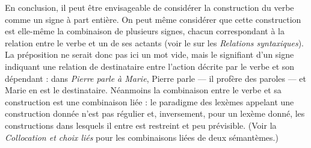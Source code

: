 {    En conclusion, il peut être envisageable de considérer la construction du verbe comme un signe à part entière. On peut même considérer que cette construction est elle-même la combinaison de plusieurs signes, chacun correspondant à la relation entre le verbe et un de ses actants (voir le  sur les \textit{Relations syntaxiques}). La préposition ne serait donc pas ici un mot vide, mais le signifiant d’un signe indiquant une relation de destinataire entre l’action décrite par le verbe et son dépendant : dans \textit{Pierre parle à Marie}, Pierre parle — il profère des paroles — et Marie en est le destinataire. Néanmoins la combinaison entre le verbe et sa construction est une combinaison liée : le paradigme des lexèmes appelant une construction donnée n’est pas régulier et, inversement, pour un lexème donné, les constructions dans lesquels il entre est restreint et peu prévisible. (Voir la  \textit{Collocation et choix liés} pour les combinaisons liées de deux sémantèmes.)

}
